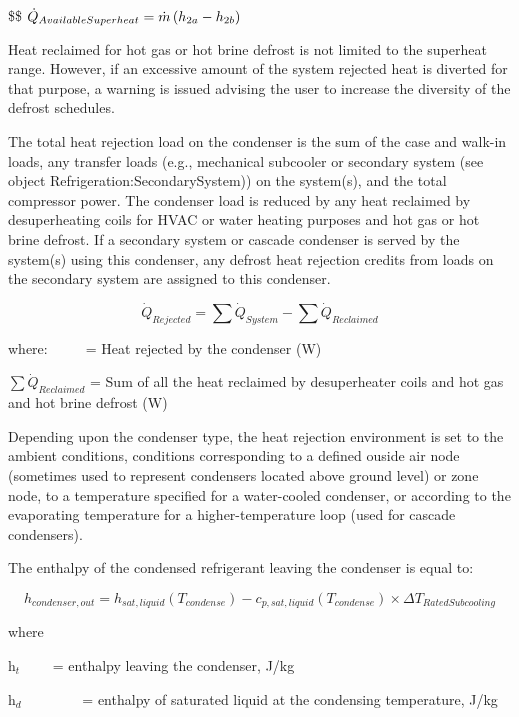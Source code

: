 \$\$ \({\dot Q_{AvailableSuperheat}} = \dot m\left( {{h_{{\rm{2}}a}} - {h_{2b}}} \right)\)

Heat reclaimed for hot gas or hot brine defrost is not limited to the superheat range. However, if an excessive amount of the system rejected heat is diverted for that purpose, a warning is issued advising the user to increase the diversity of the defrost schedules.

The total heat rejection load on the condenser is the sum of the case and walk-in loads, any transfer loads (e.g., mechanical subcooler or secondary system (see object Refrigeration:SecondarySystem)) on the system(s), and the total compressor power. The condenser load is reduced by any heat reclaimed by desuperheating coils for HVAC or water heating purposes and hot gas or hot brine defrost. If a secondary system or cascade condenser is served by the system(s) using this condenser, any defrost heat rejection credits from loads on the secondary system are assigned to this condenser.

\begin{equation}
{\dot Q_{Rejected}} = \sum {{{\dot Q}_{System}}}  - \sum {{{\dot Q}_{Reclaimed}}}
\end{equation}

where: \(_{}\)~~~~ = Heat rejected by the condenser (W)

\(\sum {{{\dot Q}_{Reclaimed}}}\) = Sum of all the heat reclaimed by desuperheater coils and hot gas and hot brine defrost (W)

Depending upon the condenser type, the heat rejection environment is set to the ambient conditions, conditions corresponding to a defined ouside air node (sometimes used to represent condensers located above ground level) or zone node, to a temperature specified for a water-cooled condenser, or according to the evaporating temperature for a higher-temperature loop (used for cascade condensers).

The enthalpy of the condensed refrigerant leaving the condenser is equal to:

\begin{equation}
{h_{condenser,out}} = {h_{sat,liquid}}({T_{condense}}) - {c_{p,sat,liquid}}({T_{condense}}) \times \Delta {T_{RatedSubcooling}}
\end{equation}

where

h\(_{t}\)~~~~ = enthalpy leaving the condenser, J/kg

h\(_{d}\)~~~~~~~~ = enthalpy of saturated liquid at the condensing temperature, J/kg

